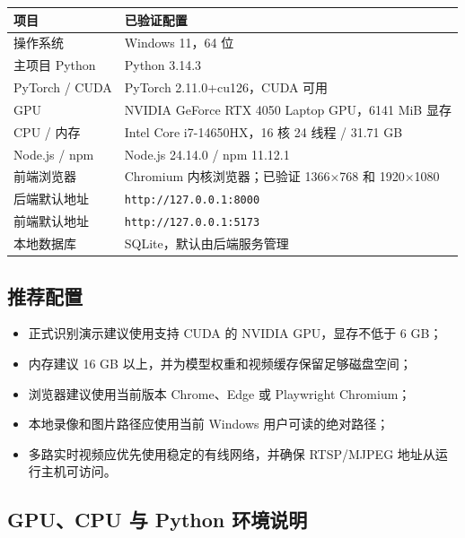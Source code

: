 \begin{longtable}[]{@{}ll@{}}
\toprule\noalign{}
项目 & 已验证配置 \\
\midrule\noalign{}
\endhead
\bottomrule\noalign{}
\endlastfoot
操作系统 & Windows 11，64 位 \\
主项目 Python & Python 3.14.3 \\
PyTorch / CUDA & PyTorch 2.11.0+cu126，CUDA 可用 \\
GPU & NVIDIA GeForce RTX 4050 Laptop GPU，6141 MiB 显存 \\
CPU / 内存 & Intel Core i7-14650HX，16 核 24 线程 / 31.71 GB \\
Node.js / npm & Node.js 24.14.0 / npm 11.12.1 \\
前端浏览器 & Chromium 内核浏览器；已验证 1366×768 和 1920×1080 \\
后端默认地址 & \texttt{http:\allowbreak{}/\allowbreak{}/\allowbreak{}127.\allowbreak{}0.\allowbreak{}0.\allowbreak{}1:\allowbreak{}8000} \\
前端默认地址 & \texttt{http:\allowbreak{}/\allowbreak{}/\allowbreak{}127.\allowbreak{}0.\allowbreak{}0.\allowbreak{}1:\allowbreak{}5173} \\
本地数据库 & SQLite，默认由后端服务管理 \\
\end{longtable}

\subsection{推荐配置}\label{manual-ux63a8ux8350ux914dux7f6e}

\begin{itemize}
\tightlist
\item
  正式识别演示建议使用支持 CUDA 的 NVIDIA GPU，显存不低于 6 GB；
\item
  内存建议 16 GB 以上，并为模型权重和视频缓存保留足够磁盘空间；
\item
  浏览器建议使用当前版本 Chrome、Edge 或 Playwright Chromium；
\item
  本地录像和图片路径应使用当前 Windows 用户可读的绝对路径；
\item
  多路实时视频应优先使用稳定的有线网络，并确保 RTSP/MJPEG 地址从运行主机可访问。
\end{itemize}

\subsection{GPU、CPU 与 Python 环境说明}\label{manual-gpucpu-ux4e0e-python-ux73afux5883ux8bf4ux660e}

